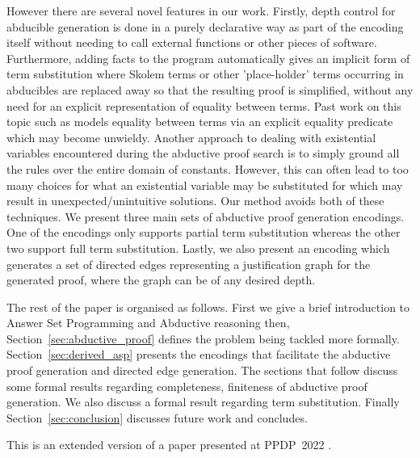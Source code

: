 However there are several novel features in our work.  Firstly, depth  control for abducible generation is done in a purely declarative way as part of the encoding itself without needing to call external functions or other pieces of software. Furthermore, adding facts to the program automatically gives an implicit form of term substitution where Skolem terms or
other 'place-holder' terms occurring in abducibles are replaced away so that
the resulting proof is simplified, without any need for an explicit representation of equality between terms. Past work on this topic such as \cite{schueller16:_model_variat_first_order_horn} models equality between terms via an explicit equality predicate which may become unwieldy. Another approach to dealing with existential variables encountered during the abductive proof search is to simply ground all the rules over the entire domain of constants. However, this can often lead to too many choices for what an existential variable may be substituted for which may result in unexpected/unintuitive solutions. Our method avoids both of these techniques. We present three main sets of abductive proof generation encodings. One of the encodings only supports partial term substitution whereas the other two support full term substitution. Lastly, we also present an encoding which generates a set of directed edges representing a justification 
graph  for the generated proof, where the graph can be of any desired depth.

The rest of the paper is organised as
follows. First we give a brief introduction to Answer Set Programming and Abductive reasoning then, Section~\ref{sec:abductive_proof} defines the problem being tackled more formally. Section~\ref{sec:derived_asp} presents the encodings that facilitate the abductive proof generation and directed edge generation. The sections that follow discuss some formal results regarding completeness, finiteness of abductive proof generation. We also discuss a formal result regarding term substitution. Finally Section~\ref{sec:conclusion} discusses
future work and concludes.

This is an extended version of a paper presented at PPDP~2022 \cite{ppdp_version}.

